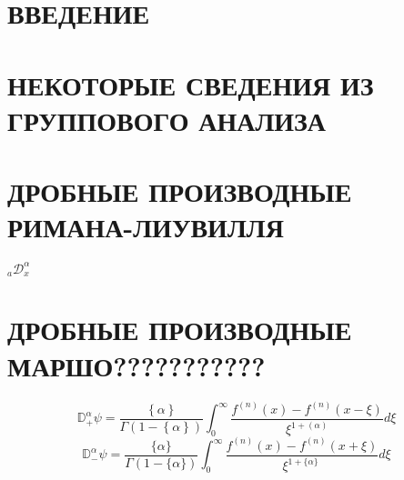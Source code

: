 \documentclass[a4paper, fontsize=14pt]{article}
\newcommand{\MD}[1]{\mathbb{D}_{#1}^{\alpha}} %
\newcommand{\RLD}[2]{{}_{#1}\mathcal{D}_{#2}^{\alpha}} %
\begin{document}
\tableofcontents

\newpage
\section*{ВВЕДЕНИЕ}

\section[Некоторые сведения из группового анализа]{НЕКОТОРЫЕ СВЕДЕНИЯ ИЗ ГРУППОВОГО АНАЛИЗА}

\section[Дробные производные Римана-Лиувилля]{ДРОБНЫЕ ПРОИЗВОДНЫЕ РИМАНА-ЛИУВИЛЛЯ}
$\RLD{a}{x}$
\section[Дробные производные Маршо]{ДРОБНЫЕ ПРОИЗВОДНЫЕ МАРШО???????????}

\begin{equation}
  \MD{ +} \psi=\frac{\left\{\alpha\right\}}{\Gamma(1-\left\{\alpha\right\})}\int_{0}^{\infty}\frac{f^{(n)}(x)-f^{(n)}(x-\xi)}{\xi^{1+\left(\alpha\right)}}d\xi
\end{equation}
\begin{equation}
  \MD{ -} \psi=\frac{\{\alpha\}}{\Gamma(1-\{\alpha\})}\int_{0}^{\infty}\frac{f^{(n)}(x)-f^{(n)}(x+\xi)}{\xi^{1+\{\alpha\}}\ } d\xi
\end{equation}
\end{document}

